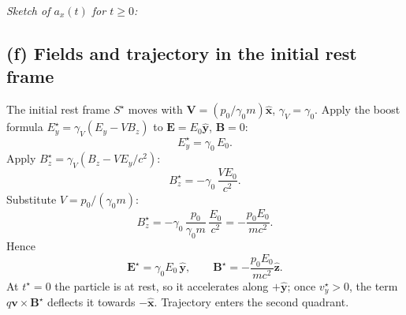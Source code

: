 \documentclass[11pt]{article}
\begin{document}
\medskip
\noindent\emph{Sketch of $a_x(t)$ for $t\geq 0$:}
\begin{center}
\end{center}

\subsection*{(f) Fields and trajectory in the initial rest frame}

The initial rest frame $S^\star$ moves with $\bm V=(p_0/\gamma_0 m)\hat{\bm x}$, $\gamma_V=\gamma_0$. Apply the boost formula $E_y^\star = \gamma_V(E_y - V B_z)$ to $\bm E=E_0\hat{\bm y}$, $\bm B=0$:
\[ E_y^\star = \gamma_0\,E_0. \]
Apply $B_z^\star = \gamma_V(B_z - V E_y/c^2)$:
\[ B_z^\star = -\gamma_0\,\frac{V E_0}{c^2}. \]
Substitute $V = p_0/(\gamma_0 m)$:
\[ B_z^\star = -\gamma_0\,\frac{p_0}{\gamma_0 m}\,\frac{E_0}{c^2} = -\frac{p_0 E_0}{m c^2}. \]
Hence
\begin{equation}
\boxed{\bm E^\star = \gamma_0 E_0\,\hat{\bm y},\qquad \bm B^\star = -\frac{p_0 E_0}{m c^2}\hat{\bm z}.}
\end{equation}
At $t^\star=0$ the particle is at rest, so it accelerates along $+\hat{\bm y}$; once $v_y^\star>0$, the term $q\bm v\times\bm B^\star$ deflects it towards $-\hat{\bm x}$. Trajectory enters the second quadrant.
\end{document}
